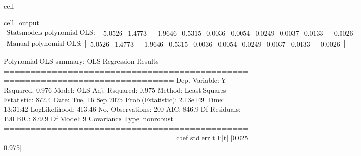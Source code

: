 \documentclass[letterpaper,10pt,english]{jupyterBook}
\begin{document}
\begin{sphinxuseclass}{cell}
\begin{sphinxVerbatimOutput}
\begin{sphinxuseclass}{cell_output}\begin{equation*}
\begin{split}\displaystyle \text{Statsmodels polynomial OLS}:\left[
\begin{array}{}
  5.0526 &  1.4773 & -1.9646 &  0.5315 &  0.0036 &  0.0054 &  0.0249 &  0.0037 &  0.0133 & -0.0026
\end{array}
\right]\end{split}
\end{equation*}\begin{equation*}
\begin{split}\displaystyle \text{Manual polynomial OLS}:\left[
\begin{array}{}
  5.0526 &  1.4773 & -1.9646 &  0.5315 &  0.0036 &  0.0054 &  0.0249 &  0.0037 &  0.0133 & -0.0026
\end{array}
\right]\end{split}
\end{equation*}
\begin{sphinxVerbatim}[commandchars=\\\{\}]
Polynomial OLS summary:
                             OLS Regression Results                            
==============================================================================
Dep. Variable:                      Y   R\PYGZhy{}squared:                       0.976
Model:                            OLS   Adj. R\PYGZhy{}squared:                  0.975
Method:                 Least Squares   F\PYGZhy{}statistic:                     872.4
Date:                Tue, 16 Sep 2025   Prob (F\PYGZhy{}statistic):          2.13e\PYGZhy{}149
Time:                        13:31:42   Log\PYGZhy{}Likelihood:                \PYGZhy{}413.46
No. Observations:                 200   AIC:                             846.9
Df Residuals:                     190   BIC:                             879.9
Df Model:                           9                                         
Covariance Type:            nonrobust                                         
==============================================================================
                 coef    std err          t      P\PYGZgt{}|t|      [0.025      0.975]
\PYGZhy{}\PYGZhy{}\PYGZhy{}\PYGZhy{}\PYGZhy{}\PYGZhy{}\PYGZhy{}\PYGZhy{}\PYGZhy{}\PYGZhy{}\PYGZhy{}\PYGZhy{}\PYGZhy{}\PYGZhy{}\PYGZhy{}\PYGZhy{}\PYGZhy{}\PYGZhy{}\PYGZhy{}\PYGZhy{}\PYGZhy{}\PYGZhy{}\PYGZhy{}\PYGZhy{}\PYGZhy{}\PYGZhy{}\PYGZhy{}\PYGZhy{}\PYGZhy{}\PYGZhy{}\PYGZhy{}\PYGZhy{}\PYGZhy{}\PYGZhy{}\PYGZhy{}\PYGZhy{}\PYGZhy{}\PYGZhy{}\PYGZhy{}\PYGZhy{}\PYGZhy{}\PYGZhy{}\PYGZhy{}\PYGZhy{}\PYGZhy{}\PYGZhy{}\PYGZhy{}\PYGZhy{}\PYGZhy{}\PYGZhy{}\PYGZhy{}\PYGZhy{}\PYGZhy{}\PYGZhy{}\PYGZhy{}\PYGZhy{}\PYGZhy{}\PYGZhy{}\PYGZhy{}\PYGZhy{}\PYGZhy{}\PYGZhy{}\PYGZhy{}\PYGZhy{}\PYGZhy{}\PYGZhy{}\PYGZhy{}\PYGZhy{}\PYGZhy{}\PYGZhy{}\PYGZhy{}\PYGZhy{}\PYGZhy{}\PYGZhy{}\PYGZhy{}\PYGZhy{}\PYGZhy{}\PYGZhy{}

\end{sphinxVerbatim}
\end{sphinxuseclass}
\end{sphinxVerbatimOutput}
\end{sphinxuseclass}
\end{document}
